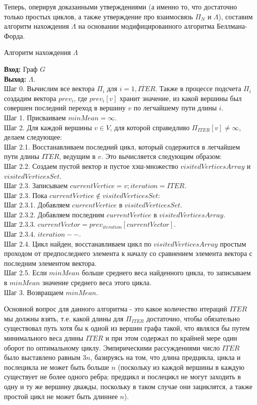 \documentclass[a4paper,12pt]{extarticle}
\theoremstyle{plain} %
\begin{document}
\begin{large}
Теперь, оперируя доказанными утверждениями (а именно то, что достаточно только простых циклов, а также утверждение про взаимосвязь $\Pi_N$ и $\Lambda$), составим алгоритм нахождения $\Lambda$ на основании модифицированного алгоритма Беллмана-Форда.

\begin{algorithm}[H]
\caption{Алгоритм нахождения $\Lambda$}
\label{diff_graph_construct}
\textbf{Вход:} Граф $G$\\
\textbf{Выход:} $\Lambda$.\\
Шаг 0. Вычислим все вектора $\Pi_i$ для $i = \overline{1, ITER}$. Также в процессе подсчета $\Pi_i$ создадим вектора $prev_i$, где $prev_i[v]$ хранит значение, из какой вершины был совершен последний переход в вершину $v$ по легчайшему пути длины $i$.\\
Шаг 1. Присваиваем $minMean = \infty$.\\
Шаг 2. Для каждой вершины $v \in V$, для которой справедливо $\Pi_{ITER}[v] \ne \infty$, делаем следующее:\\
Шаг 2.1. Восстанавливаем последний цикл, который содержится в легчайшем пути длины $ITER$, ведущим в $v$. Это вычисляется следующим образом:\\
Шаг 2.2. Создаем пустой вектор и пустое хэш-множество $visitedVerticesArray$ и $visitedVerticesSet$.\\
Шаг 2.3. Записываем $currentVertice = v; iteration = ITER$.\\
Шаг 2.3. Пока $currentVertice \notin visitedVerticesSet$:\\
Шаг 2.3.1. Добавляем $currentVertice$ в $visitedVerticesSet$.\\
Шаг 2.3.2. Добавляем последним $currentVertice$ в $visitedVerticesArray$.\\
Шаг 2.3.3. $currentVector = prev_{iteration}[currentVector]$.\\
Шаг 2.3.4. $iteration--$.\\
Шаг 2.4. Цикл найден, восстанавливаем цикл по $visitedVerticesArray$ простым проходом от предпоследнего элемента к началу со сравнением элемента вектора с последним элементом вектора.\\
Шаг 2.5. Если $minMean$ больше среднего веса найденного цикла, то записываем в $minMean$ значение среднего веса этого цикла.\\
Шаг 3. Возвращаем $minMean$.\\ 
\end{algorithm}

Основной вопрос для данного алгоритма - это какое количество итераций $ITER$ мы должны взять, т.е. какой длины для $\Pi_{ITER}$ достаточно, чтобы обязательно существовал путь хотя бы к одной из вершин графа такой, что являлся бы путем минимального веса длины $ITER$ и при этом содержал по крайней мере один оборот по оптимальному циклу. Эмпирическими рассуждениями число $ITER$ было выставлено равным $3n$, базируясь на том, что длина предцикла, цикла и послецикла не может быть больше $n$ (поскольку из каждой вершины в каждую существует не более одного ребра; предцикл и послецикл не могут заходить в одну и ту же вершину дважды, поскольку в таком случае они зациклятся, а также простой цикл не может быть длиннее $n$).


\end{large}
\end{document}
